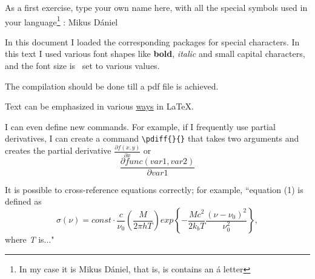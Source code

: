 \documentclass[12pt]{article}
\begin{document}
As a first exercise, type your own name here, with all the special symbols used in your
language\footnote{In my case it is Mikus Dániel, that is, is contains an á letter}
:
Mikus Dániel \par
 In this document I loaded the corresponding packages for special characters. In this text I used various font shapes like \textbf{bold}, \textit{italic} and small capital characters, {\tiny and} the font size is ~{\huge set to various values.} \par
The compilation should be done till a pdf file is achieved. \par
Text can be emphasized in various \underline{ways} in {\LaTeX}. \par
I can even define new commands. For example, if I frequently use partial derivatives, I can create a command \verb!\pdiff{}{}! that takes two arguments and creates the partial derivative
\newcommand{\pdiff}[2]{\frac{\partial #1}{\partial #2}}
$\pdiff{f (x,y)}{x}$ or
\[ \pdiff{func(var1,var2)}{var1} \] \par
It is possible to cross-reference equations correctly; for example, “equation (1) is defined as
\begin{equation}
\sigma (\nu ) = const \cdot \frac{c}{\nu _0} \left( \frac{M}{2 \pi h T} \right) exp \left\lbrace - \frac{M c^2}{2k_b T} \frac{(\nu - \nu _0)^2}{\nu _0^2} \right\rbrace ,
\end{equation} 
where {\textit{T}} is..."
\end{document}

